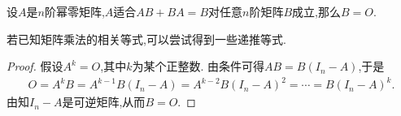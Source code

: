 \documentclass[../../main.tex]{subfiles}%
\begin{document}
\begin{example}
设\(A\)是\(n\)阶幂零矩阵,\(A\)适合\(AB+BA=B\)对任意\(n\)阶矩阵\(B\)成立,那么\(B = O\).
\end{example}
\begin{note}
若已知矩阵乘法的相关等式,可以尝试得到一些递推等式.
\end{note}
\begin{proof}

假设\(A^k = O\),其中\(k\)为某个正整数. 由条件可得\(AB = B(I_n - A)\),于是
\begin{align*}
O=A^kB=A^{k-1}B(I_n-A)=A^{k-2}B(I_n-A)^2=\cdots =B(I_n-A)^k.
\end{align*}
由知\(I_n - A\)是可逆矩阵,从而\(B = O\).

\end{proof}
\end{document}

